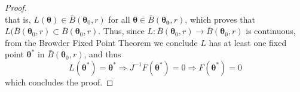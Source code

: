 \documentclass[12pt]{article} %
\newcommand{\bs}{\boldsymbol}
\newtheorem{lemma}{Lemma}
\theoremstyle{definition}
\begin{document}
\begin{proof}
\begin{equation*}
\end{equation*}
that is, $L(\bs{\theta})\in \bar{B}(\bs{\theta}_0,r)$ for all $\bs{\theta}\in \bar{B}(\bs{\theta_0},r)$, which proves that $L(\bar{B}(\bs{\theta}_0,r)\subset \bar{B}(\bs{\theta}_0,r)$. Thus, since $L:\bar{B}(\bs{\theta}_0,r)\to \bar{B}( \bs{\theta}_0,r)$ is continuous, from the Browder Fixed Point Theorem we conclude $L$ has at least one fixed point $\bs{\theta}^*$ in $\bar{B}(\bs{\theta}_0,r)$, and thus
\begin{equation*}L(\bs{\theta}^*)=\bs{\theta}^*\Rightarrow J^{-1}F(\bs{\theta}^*)=0\Rightarrow F(\bs{\theta}^*)=0
\end{equation*}
which concludes the proof.
\end{proof}



 
\end{document}
